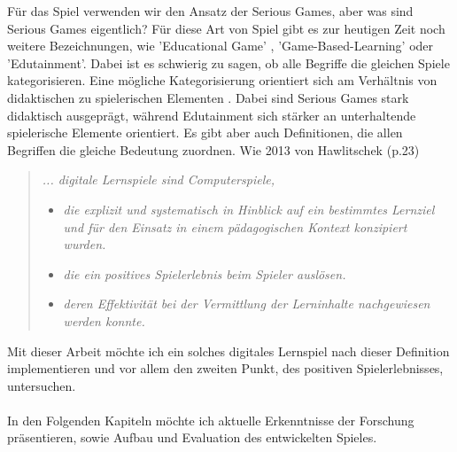 Für das Spiel verwenden wir den Ansatz der Serious Games, aber was sind Serious Games eigentlich? Für diese Art von Spiel gibt es zur heutigen Zeit noch weitere Bezeichnungen, wie 'Educational Game' , 'Game-Based-Learning' oder 'Edutainment'. Dabei ist es schwierig zu sagen, ob alle Begriffe die gleichen Spiele kategorisieren. Eine mögliche Kategorisierung orientiert sich am Verhältnis von didaktischen zu spielerischen Elementen \cite{Wechselberger2009}. Dabei sind Serious Games stark didaktisch ausgeprägt, während Edutainment sich stärker an unterhaltende spielerische Elemente orientiert. Es gibt aber auch Definitionen, die allen Begriffen die gleiche Bedeutung zuordnen. Wie 2013 von Hawlitschek\cite{hawlitschek2013} (p.23)
\begin{quote}
\textit{... digitale Lernspiele sind Computerspiele,}
\begin{itemize}
\item \textit{die explizit und systematisch in Hinblick auf ein bestimmtes Lernziel und für den Einsatz in einem pädagogischen Kontext konzipiert wurden.}
\item \textit{die ein positives Spielerlebnis beim Spieler auslösen.}
\item \textit{deren Effektivität bei der Vermittlung der Lerninhalte nachgewiesen werden konnte.}
\end{itemize}
\end{quote}
Mit dieser Arbeit möchte ich ein solches digitales Lernspiel nach dieser Definition implementieren und vor allem den zweiten Punkt, des positiven Spielerlebnisses, untersuchen.\\
\\
In den Folgenden Kapiteln möchte ich aktuelle Erkenntnisse der Forschung präsentieren, sowie Aufbau und Evaluation des entwickelten Spieles.